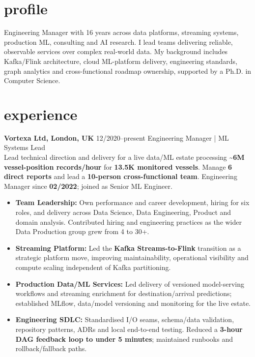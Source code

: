 \documentclass[]{../../../../friggeri-cv}
\renewcommand{\entry}[4]{%
  \parbox[t]{\dimexpr\textwidth-\entryleftinset\relax}{%
    \textbf{#2}%
    {\footnotesize\addfontfeature{Color=lightgray}\hspace{0.6em}#1}%
    \hfill%
    {\small\color{textcolor} #3}\\%
    #4\vspace{\parsep}%
  }\\}
\begin{document}
\section{profile}
{\normalsize Engineering Manager with 16 years across data platforms, streaming systems, production ML, consulting and AI research. I lead teams delivering reliable, observable services over complex real-world data. My background includes Kafka/Flink architecture, cloud ML-platform delivery, engineering standards, graph analytics and cross-functional roadmap ownership, supported by a Ph.D. in Computer Science.}
\section{experience}
\begin{entrylist}
    \entry
    {12/2020--present}
    {Vortexa Ltd, London, UK}
    {Engineering Manager | ML Systems Lead}
    {
        {\small
        \setlength{\parindent}{0pt}
        \setlength{\leftskip}{0pt}
        Lead technical direction and delivery for a live data/ML estate processing \textbf{\textasciitilde6M vessel-position records/hour} for \textbf{13.5K monitored vessels}. Manage \textbf{6 direct reports} and lead a \textbf{10-person cross-functional team}. Engineering Manager since \textbf{02/2022}; joined as Senior ML Engineer.
        }
        \begin{itemize}[leftmargin=1.1em, itemsep=2pt, topsep=3pt, parsep=0pt]
            \item \small\textbf{Team Leadership:} Own performance and career development, hiring for six roles, and delivery across Data Science, Data Engineering, Product and domain analysis. Contributed hiring and engineering practices as the wider Data Production group grew from 4 to 30+.
            \item \small\textbf{Streaming Platform:} Led the \textbf{Kafka Streams-to-Flink} transition as a strategic platform move, improving maintainability, operational visibility and compute scaling independent of Kafka partitioning.
            \item \small\textbf{Production Data/ML Services:} Led delivery of versioned model-serving workflows and streaming enrichment for destination/arrival predictions; established MLflow, data/model versioning and monitoring for the live estate.
            \item \small\textbf{Engineering SDLC:} Standardised I/O seams, schema/data validation, repository patterns, ADRs and local end-to-end testing. Reduced a \textbf{3-hour DAG feedback loop to under 5 minutes}; maintained runbooks and rollback/fallback paths.

\end{itemize}}
\end{entrylist}
\end{document}
